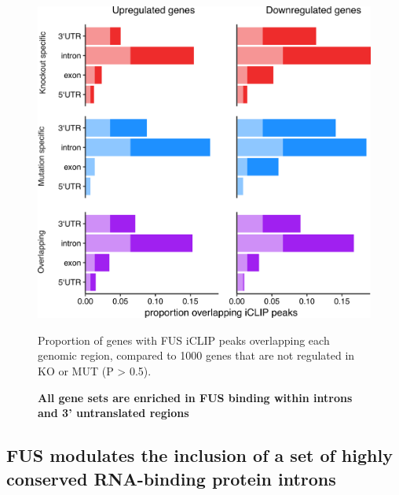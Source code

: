 \begin{figure}[h!]
	\centering
	\includegraphics[width=12cm]{Figures/06_fus_meta/expression_iclip_region_binding.png}
	\caption{\textbf{All gene sets are enriched in FUS binding within introns and 3' untranslated regions} }	
	Proportion of genes with FUS iCLIP peaks overlapping each genomic region, compared to 1000 genes that are not regulated in KO or MUT (P > 0.5).
	\label{fig:fus_expression_iclip}
\end{figure}




\subsection{FUS modulates the inclusion of a set of highly conserved RNA-binding protein introns}

